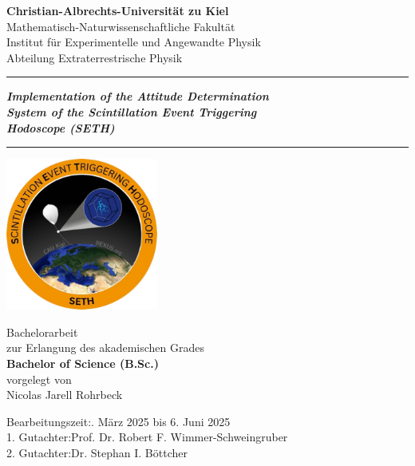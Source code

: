 \begin{titlepage}
\Huge\centering

\textbf{Christian-Albrechts-Universität zu Kiel}\\\LARGE\vspace{0.6cm}
Mathematisch-Naturwissenschaftliche Fakultät\\
\Large\vspace{0.2cm}
Institut für Experimentelle und Angewandte Physik\\\vspace{0.1cm}
Abteilung Extraterrestrische Physik\\\LARGE\vspace{2cm}

\hrule
\textbf{\textit{Implementation of the Attitude Determination\\ System of the Scintillation Event Triggering\\ Hodoscope (SETH)}}
\vspace{0.3cm}
\hrule
\vspace{1cm}

\includegraphics[height=5cm]{images/logo_SETH_v2_nobg.png}

\vspace{0.9cm}

\LARGE
Bachelorarbeit\\\vspace{0.2cm}\Large
zur Erlangung des akademischen Grades\\\vspace{0.2cm}\LARGE
\textbf{Bachelor of Science (B.Sc.)}\\
\large\vspace{1cm}
vorgelegt von\\\vspace{0.2cm}\Large
Nicolas Jarell Rohrbeck

\vspace{1.1cm}
\normalsize
\begin{flushleft}
Bearbeitungszeit:. März 2025 bis 6. Juni 2025\\
1. Gutachter:\quad Prof. Dr. Robert F. Wimmer-Schweingruber\\
2. Gutachter:\quad Dr. Stephan I. Böttcher\\
\end{flushleft}

\end{titlepage}
\restoregeometry